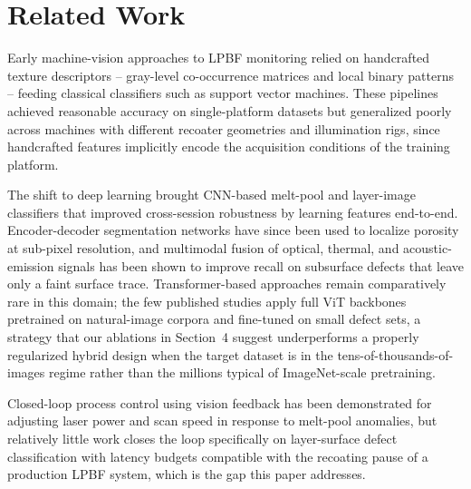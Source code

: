 \section{Related Work}
Early machine-vision approaches to LPBF monitoring relied on handcrafted texture descriptors -- gray-level co-occurrence matrices and local binary patterns -- feeding classical classifiers such as support vector machines. These pipelines achieved reasonable accuracy on single-platform datasets but generalized poorly across machines with different recoater geometries and illumination rigs, since handcrafted features implicitly encode the acquisition conditions of the training platform.

The shift to deep learning brought CNN-based melt-pool and layer-image classifiers that improved cross-session robustness by learning features end-to-end. Encoder-decoder segmentation networks have since been used to localize porosity at sub-pixel resolution, and multimodal fusion of optical, thermal, and acoustic-emission signals has been shown to improve recall on subsurface defects that leave only a faint surface trace. Transformer-based approaches remain comparatively rare in this domain; the few published studies apply full ViT backbones pretrained on natural-image corpora and fine-tuned on small defect sets, a strategy that our ablations in Section~4 suggest underperforms a properly regularized hybrid design when the target dataset is in the tens-of-thousands-of-images regime rather than the millions typical of ImageNet-scale pretraining.

Closed-loop process control using vision feedback has been demonstrated for adjusting laser power and scan speed in response to melt-pool anomalies, but relatively little work closes the loop specifically on layer-surface defect classification with latency budgets compatible with the recoating pause of a production LPBF system, which is the gap this paper addresses.

